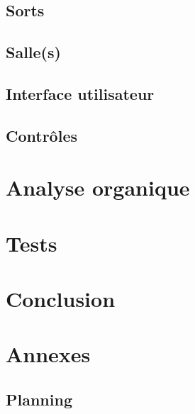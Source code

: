 \documentclass[11pt, a4paper, oneside]{report}
\begin{document}
\section{Sorts}

\section{Salle(s)}
\section{Interface utilisateur}
\section{Contrôles}
\newpage
\chapter{Analyse organique}

\newpage
\chapter{Tests}

\newpage
\chapter{Conclusion}

\newpage
\chapter{Annexes}
\section{Planning}
\end{document}
